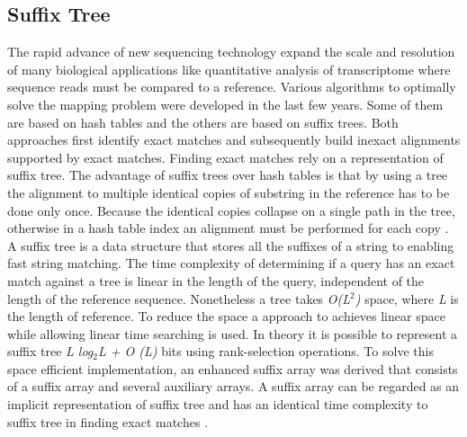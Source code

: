 \documentclass[12pt, a4paper]{report}
\begin{document}
\subsection{Suffix Tree}
The rapid advance of new sequencing technology expand the scale and resolution of many biological applications like quantitative analysis of transcriptome where sequence reads must be compared to a reference. Various algorithms to optimally solve the mapping problem were developed in the last few years. Some of them are based on hash tables and the others are based on suffix trees. Both approaches first identify exact matches and subsequently build inexact alignments supported by exact matches. Finding exact matches rely on a representation of suffix tree. 
The advantage of suffix trees over hash tables is that by using a tree the alignment to multiple identical copies of substring in the reference has to be done only once. Because the identical copies collapse on a single path in the tree, otherwise in a hash table index an alignment must be performed for each copy \cite{Li2010}. \\
A suffix tree is a data structure that stores all the suffixes of a string to enabling fast string matching. The time complexity of determining if a query has an exact match against a tree is linear in the length of the query, independent of the length of the reference sequence. Nonetheless a tree takes \textit{O(L$^2$)} space, where \textit{L} is the length of reference. To reduce the space a approach to achieves linear space while allowing linear time searching is used. In theory it is possible to represent a suffix tree \textit{L log$_2$L + O (L)} bits using rank-selection operations. To solve this space efficient implementation,  an enhanced suffix array was derived that consists of a suffix array and several auxiliary arrays. A suffix array can be regarded as an implicit representation of suffix tree and has an identical time complexity to suffix tree in finding exact matches \cite{Li2010}. 

\end{document}
